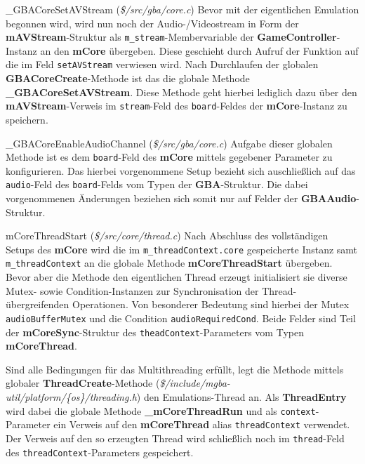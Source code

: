 \documentclass[11pt,a4paper]{scrartcl}
\begin{document}
\vspace{5mm}
\large {\_}GBACoreSetAVStream \normalsize(\textit{\$/src/gba/core.c})
\vspace{2mm}\newline
Bevor mit der eigentlichen Emulation begonnen wird, wird nun noch der Audio-/Videostream in Form der \textbf{mAVStream}-Struktur als \verb|m_stream|-Membervariable der \textbf{GameController}-Instanz an den \textbf{mCore} \"ubergeben. Diese geschieht durch Aufruf der Funktion auf die im Feld \verb|setAVStream| verwiesen wird. Nach Durchlaufen der globalen \textbf{GBACoreCreate}-Methode ist das die globale Methode \textbf{{\_}GBACoreSetAVStream}. Diese Methode geht hierbei lediglich dazu \"uber den \textbf{mAVStream}-Verweis im \verb|stream|-Feld des \verb|board|-Feldes der \textbf{mCore}-Instanz zu speichern.

\vspace{5mm}
\large {\_}GBACoreEnableAudioChannel \normalsize(\textit{\$/src/gba/core.c})
\vspace{2mm}\newline
Aufgabe dieser globalen Methode ist es dem \verb|board|-Feld des \textbf{mCore} mittels gegebener Parameter zu konfigurieren. Das hierbei vorgenommene Setup bezieht sich auschlie{\ss}lich auf das \verb|audio|-Feld des \verb|board|-Felds vom Typen der \textbf{GBA}-Struktur. Die dabei vorgenommenen \"Anderungen beziehen sich somit nur auf Felder der \textbf{GBAAudio}-Struktur.

\vspace{5mm}
\large mCoreThreadStart \normalsize(\textit{\$/src/core/thread.c})
\vspace{2mm}\newline
Nach Abschluss des vollst\"andigen Setups des \textbf{mCore} wird die im \verb|m_threadContext.core| gespeicherte Instanz samt \verb|m_threadContext| an die globale Methode \textbf{mCoreThreadStart} \"ubergeben. Bevor aber die Methode den eigentlichen Thread erzeugt initialisiert sie diverse Mutex- sowie Condition-Instanzen zur Synchronisation der Thread-\"ubergreifenden Operationen. Von besonderer Bedeutung sind hierbei der Mutex \verb|audioBufferMutex| und die Condition \verb|audioRequiredCond|. Beide Felder sind Teil der \textbf{mCoreSync}-Struktur des \verb|theadContext|-Parameters vom Typen \textbf{mCoreThread}.

Sind alle Bedingungen f\"ur das Multithreading erf\"ullt, legt die Methode mittels globaler \textbf{ThreadCreate}-Methode (\textit{\$/include/mgba-util/platform/\{os\}/threading.h}) den Emulations-Thread an. Als \textbf{ThreadEntry} wird dabei die globale Methode \textbf{{\_}mCoreThreadRun} und als \verb|context|-Parameter ein Verweis auf den \textbf{mCoreThread} alias \verb|threadContext| verwendet. Der Verweis auf den so erzeugten Thread wird schlie{\ss}lich noch im \verb|thread|-Feld des \verb|threadContext|-Parameters gespeichert.
\end{document}
